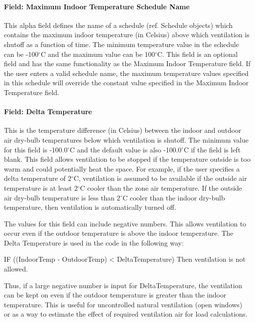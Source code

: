 \paragraph{Field: Maximum Indoor Temperature Schedule Name}\label{field-maximum-indoor-temperature-schedule-name-1}

This alpha field defines the name of a schedule (ref. Schedule objects) which contains the maximum indoor temperature (in Celsius) above which ventilation is shutoff as a function of time. The minimum temperature value in the schedule can be -100$^\circ$C and the maximum value can be 100$^\circ$C. This field is an optional field and has the same functionality as the Maximum Indoor Temperature field. If the user enters a valid schedule name, the maximum temperature values specified in this schedule will override the constant value specified in the Maximum Indoor Temperature field.

\paragraph{Field: Delta Temperature}\label{field-delta-temperature-1}

This is the temperature difference (in Celsius) between the indoor and outdoor air dry-bulb temperatures below which ventilation is shutoff. The minimum value for this field is -100.0$^\circ$C and the default value is also -100.0$^\circ$C if the field is left blank. This field allows ventilation to be stopped if the temperature outside is too warm and could potentially heat the space. For example, if the user specifies a delta temperature of 2$^\circ$C, ventilation is assumed to be available if the outside air temperature is at least 2$^\circ$C cooler than the zone air temperature. If the outside air dry-bulb temperature is less than 2$^\circ$C cooler than the indoor dry-bulb temperature, then ventilation is automatically turned off.

The values for this field can include negative numbers. This allows ventilation to occur even if the outdoor temperature is above the indoor temperature. The Delta Temperature is used in the code in the following way:

IF ((IndoorTemp - OutdoorTemp) \textless{} DeltaTemperature) Then ventilation is not allowed.

Thus, if a large negative number is input for DeltaTemperature, the ventilation can be kept on even if the outdoor temperature is greater than the indoor temperature. This is useful for uncontrolled natural ventilation (open windows) or as a way to estimate the effect of required ventilation air for load calculations.

